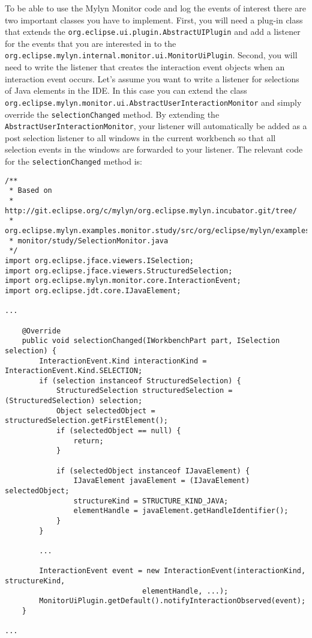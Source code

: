 To be able to use the Mylyn Monitor code and log the events of interest there are two important classes you have to implement. First, you will need a plug-in class that extends the \texttt{org.eclipse.ui.plugin.AbstractUIPlugin} and add a listener for the events that you are interested in to the \texttt{org.eclipse.mylyn.internal.monitor.ui.MonitorUiPlugin}. Second, you will need to write the listener that creates the interaction event objects when an interaction event occurs. Let's assume you want to write a listener for selections of Java elements in the IDE. In this case you can extend the class \texttt{org.eclipse.mylyn.monitor.ui.AbstractUserInteractionMonitor} and simply override the \texttt{selectionChanged} method. By extending the \texttt{AbstractUserInteractionMonitor}, your listener will automatically be added as a post selection listener to all windows in the current workbench so that all selection events in the windows are forwarded to your listener. The relevant code for the \texttt{selectionChanged} method is:



\begin{lstlisting}
/** 
 * Based on
 * http://git.eclipse.org/c/mylyn/org.eclipse.mylyn.incubator.git/tree/
 * org.eclipse.mylyn.examples.monitor.study/src/org/eclipse/mylyn/examples/
 * monitor/study/SelectionMonitor.java
 */
import org.eclipse.jface.viewers.ISelection;
import org.eclipse.jface.viewers.StructuredSelection;
import org.eclipse.mylyn.monitor.core.InteractionEvent;
import org.eclipse.jdt.core.IJavaElement;

...

    @Override
    public void selectionChanged(IWorkbenchPart part, ISelection selection) {
		InteractionEvent.Kind interactionKind = InteractionEvent.Kind.SELECTION;
		if (selection instanceof StructuredSelection) {
			StructuredSelection structuredSelection = (StructuredSelection) selection;
			Object selectedObject = structuredSelection.getFirstElement();
			if (selectedObject == null) {
				return;
			}

			if (selectedObject instanceof IJavaElement) {
				IJavaElement javaElement = (IJavaElement) selectedObject;
				structureKind = STRUCTURE_KIND_JAVA;
				elementHandle = javaElement.getHandleIdentifier();
			}
		}

		...

		InteractionEvent event = new InteractionEvent(interactionKind, structureKind,
                                elementHandle, ...);
		MonitorUiPlugin.getDefault().notifyInteractionObserved(event);
	}

...
\end{lstlisting}

